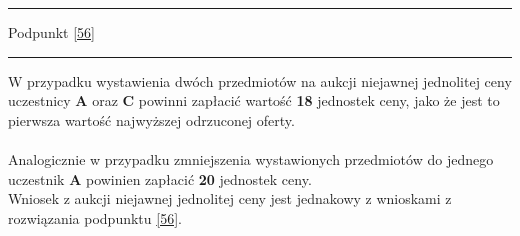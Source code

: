 \documentclass[
    12pt, %
]{../fphw}
\begin{document}
\par\noindent\rule{\textwidth}{0.4pt}
Podpunkt \ref{56}
\par\noindent\rule{\textwidth}{0.4pt}
W przypadku wystawienia dwóch przedmiotów na aukcji niejawnej jednolitej ceny
uczestnicy \textbf{A} oraz \textbf{C} powinni zapłacić wartość \textbf{18} jednostek ceny,
jako że jest to pierwsza wartość najwyższej odrzuconej oferty.
\\ \\
Analogicznie w przypadku zmniejszenia wystawionych przedmiotów do jednego
uczestnik \textbf{A} powinien zapłacić \textbf{20} jednostek ceny.
\\
Wniosek z aukcji niejawnej jednolitej ceny jest jednakowy z wnioskami z rozwiązania podpunktu \ref{56}.
\newpage
\lstlistoflistings
\listoffigures
\listoftables
\end{document}
